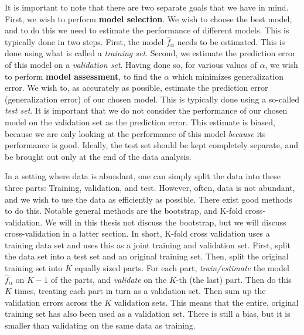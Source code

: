 It is important to note that there are two separate goals that we have in mind.
First, we wish to perform \textbf{model selection}.
We wish to choose the best model, and to do this we need to estimate the performance of different models.
This is typically done in two steps.
First, the model $\hat{f}_\alpha$ needs to be estimated.
This is done using what is called a \textit{training set}.
Second, we estimate the prediction error of this model on a \textit{validation set}.
Having done so, for various values of $\alpha$, we wish to perform \textbf{model assessment}, to find the $\alpha$ which minimizes generalization error.
We wish to, as accurately as possible, estimate the prediction error (generalization error) of our chosen model.
This is typically done using a so-called \textit{test set}.
It is important that we do not consider the performance of our chosen model on the validation set as the prediction error.
This estimate is biased, because we are only looking at the performance of this model \textit{because} its performance is good.
Ideally, the test set should be kept completely separate, and be brought out only at the end of the data analysis.

In a setting where data is abundant, one can simply split the data into these three parts: Training, validation, and test.
However, often, data is not abundant, and we wish to use the data as efficiently as possible.
There exist good methods to do this.
Notable general methods are the bootstrap, and K-fold cross-validation.
We will in this thesis not discuss the bootstrap, but we will discuss cross-validation in a latter section.
In short, K-fold cross validation uses a training data set and uses this as a joint training and validation set.
First, split the data set into a test set and an original training set.
Then, split the original training set into $K$ equally sized parts.
For each part, \textit{train/estimate} the model $\hat{f}_\alpha$ on $K-1$ of the parts, and \textit{validate} on the $K$-th (the last) part.
Then do this $K$ times, treating each part in turn as a validation set.
Then sum up the validation errors across the $K$ validation sets.
This means that the entire, original training set has also been used as a validation set.
There is still a bias, but it is smaller than validating on the same data as training. 

